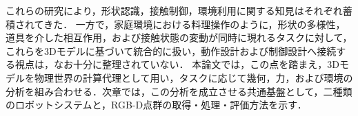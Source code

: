 これらの研究により，形状認識，接触制御，環境利用に関する知見はそれぞれ蓄積されてきた．
一方で，家庭環境における料理操作のように，形状の多様性，道具を介した相互作用，および接触状態の変動が同時に現れるタスクに対して，これらを3Dモデルに基づいて統合的に扱い，動作設計および制御設計へ接続する視点は，なお十分に整理されていない．
本論文では，この点を踏まえ，3Dモデルを物理世界の計算代理として用い，タスクに応じて幾何，力，および環境の分析を組み合わせる．次章では，この分析を成立させる共通基盤として，二種類のロボットシステムと，RGB-D点群の取得・処理・評価方法を示す．









